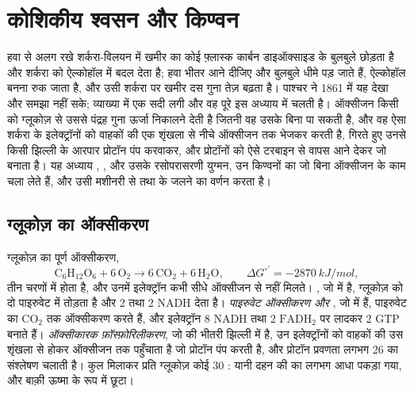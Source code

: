 \chapter{कोशिकीय श्वसन और किण्वन}\label{ch:b1:respiration-fermentation}

हवा से अलग रखे शर्करा-विलयन में खमीर का कोई फ़्लास्क कार्बन डाइऑक्साइड के
बुलबुले छोड़ता है और शर्करा को ऐल्कोहॉल में बदल देता है; हवा भीतर आने
दीजिए और बुलबुले धीमे पड़ जाते हैं, ऐल्कोहॉल बनना रुक जाता है, और उसी
शर्करा पर खमीर दस गुना तेज़ बढ़ता है। पाश्चर ने 1861 में यह देखा और
समझा नहीं सके; व्याख्या में एक सदी लगी और वह पूरे इस अध्याय में चलती है।
ऑक्सीजन किसी  को ग्लूकोज़ से उससे पंद्रह गुना ऊर्जा निकालने देती है
जितनी वह उसके बिना पा सकती है, और वह ऐसा शर्करा के इलेक्ट्रॉनों को
वाहकों की एक शृंखला से नीचे ऑक्सीजन तक भेजकर करती है, गिरते हुए उनसे किसी
झिल्ली के आरपार प्रोटॉन पंप करवाकर, और प्रोटॉनों को ऐसे टरबाइन से वापस
आने देकर जो  बनाता है। यह अध्याय , ,  और उसके रसोपरासरणी युग्मन, उन किण्वनों का जो बिना ऑक्सीजन के काम
चला लेते हैं, और उसी मशीनरी से  तथा  के जलने का वर्णन करता
है।

\section{ग्लूकोज़ का ऑक्सीकरण}

\begin{proposition}\label{prop:b1:respiration-fermentation:overview}
ग्लूकोज़ का पूर्ण ऑक्सीकरण,
\[
\mathrm{C_6H_{12}O_6} + 6\,\mathrm{O_2} \to 6\,\mathrm{CO_2} + 6\,\mathrm{H_2O},
\qquad \Delta G^{\circ\prime} = \qty{-2870}{kJ/mol},
\]
तीन चरणों में होता है, और उनमें इलेक्ट्रॉन कभी सीधे ऑक्सीजन से नहीं
मिलते। \emph{}, जो  में है, ग्लूकोज़ को
दो पाइरुवेट में तोड़ता है और 2  तथा 2 NADH देता है। \emph{पाइरुवेट
ऑक्सीकरण और }, जो  में हैं, पाइरुवेट का
$\mathrm{CO_2}$ तक ऑक्सीकरण करते हैं, और इलेक्ट्रॉन 8 NADH तथा
2 $\mathrm{FADH_2}$ पर लादकर 2 GTP बनाते हैं। \emph{ऑक्सीकारक
फ़ॉस्फ़ोरिलीकरण}, जो  की भीतरी झिल्ली में है, उन
इलेक्ट्रॉनों को वाहकों की उस शृंखला से होकर ऑक्सीजन तक पहुँचाता है जो
प्रोटॉन पंप करती है, और प्रोटॉन प्रवणता लगभग 26  का संश्लेषण चलाती है।
कुल मिलाकर प्रति ग्लूकोज़ कोई 30 : यानी दहन की  का लगभग
आधा पकड़ा गया, और बाक़ी ऊष्मा के रूप में छूटा।
\end{proposition}

